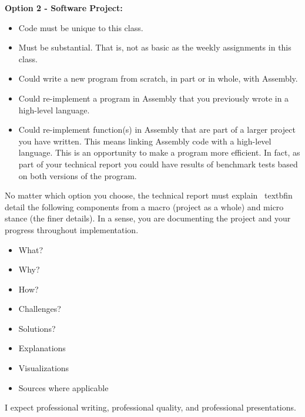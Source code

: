 \documentclass[twoside]{article}
\begin{document}
\textbf{Option 2 - Software Project:}
\begin{itemize}
\item Code must be unique to this class.
\item Must be substantial. That is, not as basic as the weekly assignments in
this class.
\item Could write a new program from scratch, in part or in whole, with
Assembly.
\item Could re-implement a program in Assembly that you previously wrote in a
high-level language.
\item Could re-implement function(s) in Assembly that are part of a larger
project you have written. This means linking Assembly code with a high-level
language. This is an opportunity to make a program more efficient. In fact, as part
of your technical report you could have results of benchmark tests based on both
versions of the program.
\end{itemize}
\noindent No matter which option you choose, the technical report must explain \
textbf{in detail} the following components from a macro (project as a whole) and
micro stance (the finer details). In a sense, you are documenting the project and
your progress throughout implementation.
\begin{itemize}
\item What?
\item Why?
\item How?
\item Challenges?
\item Solutions?
\item Explanations
\item Visualizations
\item Sources where applicable
\end{itemize}
I expect professional writing, professional quality, and professional
presentations.
\end{document}
